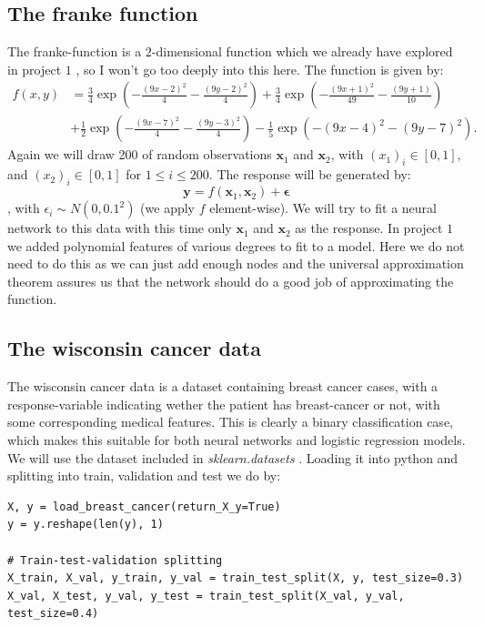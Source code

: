 \documentclass{article}
\begin{document}
\subsection{The franke function}
The franke-function is a $2$-dimensional function which we already have explored
in project $1$ \cite{githubrepoproject1}, so I won't go too deeply into this
here. The function is given by:
\begin{align*}
      f(x,y) & = \frac{3}{4}\exp{\left(-\frac{(9x-2)^2}{4} - \frac{(9y-2)^2}{4}\right)}+\frac{3}{4}\exp{\left(-\frac{(9x+1)^2}{49}- \frac{(9y+1)}{10}\right)} \\
             & +\frac{1}{2}\exp{\left(-\frac{(9x-7)^2}{4} - \frac{(9y-3)^2}{4}\right)} -\frac{1}{5}\exp{\left(-(9x-4)^2 - (9y-7)^2\right) }.
\end{align*}
Again we will draw 200 of random observations $\bm{x}_1$ and $\bm{x}_2$, with
$(x_1)_i \in [0, 1]$, and $(x_2)_i \in [0, 1]$ for $1 \leq i \leq 200$. The response will be generated by:
$$\bm{y} = f(\bm{x}_1, \bm{x}_2) + \bm{\epsilon}$$
, with $\epsilon_i \sim N(0, 0.1^2)$ (we apply $f$ element-wise). We will try to
fit a neural network to this data with this time only $\bm{x}_1$ and $\bm{x}_2$
as the response. In project $1$ we added polynomial features of various degrees
to fit to a model. Here we do not need to do this as we can just add enough
nodes and the universal approximation theorem assures us that the network should
do a good job of approximating the function.

\subsection{The wisconsin cancer data}
The wisconsin cancer data \cite{breastcancerwisconsin} is a dataset containing
breast cancer cases, with a response-variable indicating wether the patient has
breast-cancer or not, with some corresponding medical features. This is clearly
a binary classification case, which makes this suitable for both neural networks
and logistic regression models. We will use the dataset included in
\textit{sklearn.datasets} \cite{sklearncancerdata}. Loading it into python and
splitting into train, validation and test we do by:

\begin{lstlisting}
X, y = load_breast_cancer(return_X_y=True)
y = y.reshape(len(y), 1)

# Train-test-validation splitting
X_train, X_val, y_train, y_val = train_test_split(X, y, test_size=0.3)
X_val, X_test, y_val, y_test = train_test_split(X_val, y_val, test_size=0.4)
\end{lstlisting}
\end{document}
